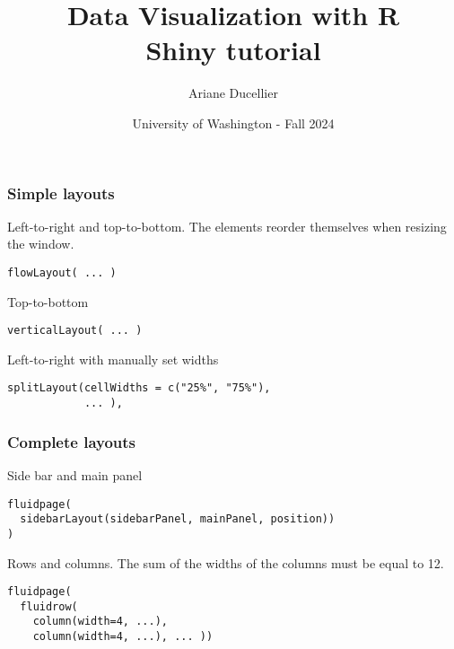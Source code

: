 \documentclass{beamer}
\title[Data Visualization with R - Shiny tutorial]{Data Visualization with R \\ Shiny tutorial}
\author{Ariane Ducellier}
\date{University of Washington - Fall 2024}
\begin{document}
	\begin{frame}
		\titlepage
	\end{frame}

	\begin{frame}[fragile]
		\frametitle{Simple layouts}
		
		Left-to-right and top-to-bottom. The elements reorder themselves when resizing the window.
		\begin{exampleblock}{}
		\begin{BVerbatim}
flowLayout( ... )
		\end{BVerbatim}
		\end{exampleblock}{}

		\vspace{1em}

		Top-to-bottom
		\begin{exampleblock}{}
		\begin{BVerbatim}
verticalLayout( ... )
		\end{BVerbatim}
		\end{exampleblock}{}

		\vspace{1em}

		Left-to-right with manually set widths
		\begin{exampleblock}{}
		\begin{lstlisting}
splitLayout(cellWidths = c("25%", "75%"),
            ... ),
		\end{lstlisting}
		\end{exampleblock}{}

	\end{frame}

	\begin{frame}[fragile]
		\frametitle{Complete layouts}
		
		Side bar and main panel
		\begin{exampleblock}{}
		\begin{BVerbatim}
fluidpage(
  sidebarLayout(sidebarPanel, mainPanel, position))
)
		\end{BVerbatim}
		\end{exampleblock}{}

		\vspace{1em}

		Rows and columns. The sum of the widths of the columns must be equal to 12.
		\begin{exampleblock}{}
		\begin{BVerbatim}
fluidpage(
  fluidrow(
    column(width=4, ...),
    column(width=4, ...), ... ))
		\end{BVerbatim}
		\end{exampleblock}{}

	\end{frame}
\end{document}
